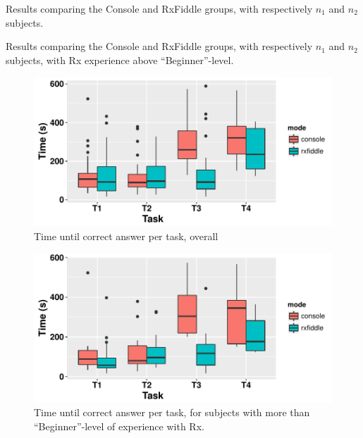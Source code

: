 \begin{table}[htbp]
    \centering
    {\centering}
    \caption{Results comparing the Console and RxFiddle groups, with
    respectively $n_1$ and $n_2$ subjects.}
    \label{table:result}
\vspace{0.4cm}
    {\centering}
    \caption{Results comparing the Console and RxFiddle groups, with
    respectively $n_1$ and $n_2$ subjects, with Rx experience above
    ``Beginner''-level.}
    \label{table:result-split}
\end{table}

\begin{figure}[htbp]
    \includegraphics[width=\columnwidth]{images/timePerTask.pdf}
    \caption{Time until correct answer per task, overall}%
    \label{fig:timePerTask}
\end{figure}

\begin{figure}[htbp]
    \includegraphics[width=\columnwidth]{images/timePerTaskRx.pdf}
    \caption{Time until correct answer per task, for subjects with more
    than ``Beginner''-level of experience with Rx.}%
    \label{fig:timePerTaskRx}
\end{figure}

